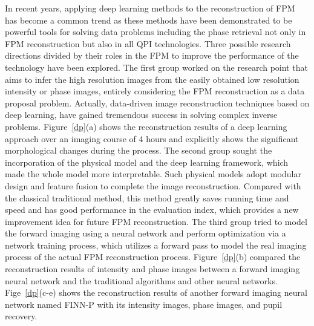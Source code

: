 \documentclass[journal,review,submit,pdftex,moreauthors]{Definitions/mdpi}
\begin{document}
In recent years, applying deep learning methods to the reconstruction of FPM has become a common trend as these methods have been demonstrated to be powerful tools for solving data problems including the phase retrieval not only in FPM reconstruction\cite{zheng2021concept} but also in all QPI technologies\cite{qayyum2022untrained}. Three possible research directions divided by their roles in the FPM to improve the performance of the technology have been explored.
The first group worked on the research point that aims to infer the high resolution images from the easily obtained low resolution intensity or phase images, entirely considering the FPM reconstruction as a data proposal problem\cite{shamshad2019deep,xue2019reliable,kappeler2017ptychnet,boominathan2018phase,zhang2019fourier,thanh2018deep}. Actually, data-driven image reconstruction techniques based on deep learning, have gained tremendous success in solving complex inverse problems. Figure~\ref{dp}(a) shows the reconstruction results of a deep learning approach over an imaging course of 4 hours and explicitly shows the significant morphological changes during the process.
The second group sought the incorporation of the physical model and the deep learning framework, which made the whole model more interpretable\cite{kellman2019physics,muthumbi2019learned,cheng2019illumination,kellman2019data,horstmeyer2017convolutional}. Such physical models adopt modular design and feature fusion to complete the image reconstruction. Compared with the classical traditional method, this method greatly saves running time and speed and has good performance in the evaluation index, which provides a new improvement idea for future FPM reconstruction. 
The third group tried to model the forward imaging using a neural network and perform optimization via a network training process, which utilizes a forward pass to model the real imaging process of the actual FPM reconstruction process\cite{wang2020virtual,jiang2018solving,zhang2019pgnn,sun2019neural,zhang2020forward}. Figure~\ref{dp}(b) compared the reconstruction results of intensity and phase images between a forward imaging neural network and the traditional algorithms and other neural networks. Fige~\ref{dp}(c-e) shows the reconstruction results of another forward imaging neural network named FINN-P  with its intensity images, phase images, and pupil recovery. 
\end{document}
